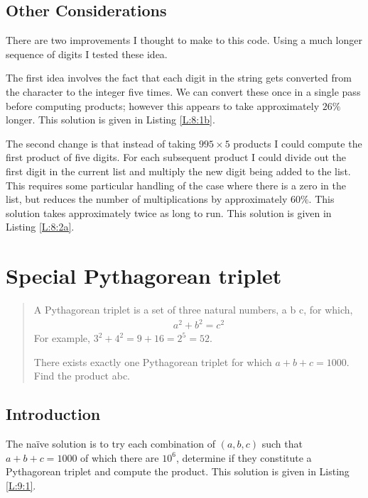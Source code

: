 \documentclass[oneside,12pt]{book}   	%
\newcounter{ex}
\newcounter{pr}
\theoremstyle{definition}
\begin{document}
\begin{spacing}{1.618}
			

		\section{Other Considerations}
		
			There are two improvements I thought to make to this code. Using a much longer sequence of digits I tested these idea. 
			
			The first idea involves the fact that each digit in the string gets converted from the character to the integer five times. We can convert these once in a single pass before computing products; however this appears to take approximately $26\%$ longer. This solution is given in Listing \ref{L:8:1b}. 
			

			The second change is that instead of taking $995\times 5$ products I could compute the first product of five digits. For each subsequent product I could divide out the first digit in the current list and multiply the new digit being added to the list. This requires some particular handling of the case where there is a zero in the list, but reduces the number of multiplications by approximately $60\%$. This solution takes approximately twice as long to run. This solution is given in Listing \ref{L:8:2a}. 
			

	\chapter{Special Pythagorean triplet}
	
		\begin{quote}
			A Pythagorean triplet is a set of three natural numbers, a  b  c, for which,
			\begin{alignat*}{4}
				a^2 + b^2 = c^2
			\end{alignat*}
			For example, $3^2 + 4^2 = 9 + 16 = 2^5 = 52$.

			There exists exactly one Pythagorean triplet for which $a + b + c = 1000$.
			Find the product abc.
		\end{quote}
		
		\section{Introduction}
			The na\"ive solution is to try each combination of $(a, b, c)$ such that $a+b+c=1000$ of which there are $10^6$, determine if they constitute a Pythagorean triplet and compute the product. This solution is given in Listing \ref{L:9:1}. 
			

\end{spacing}
\end{document}
